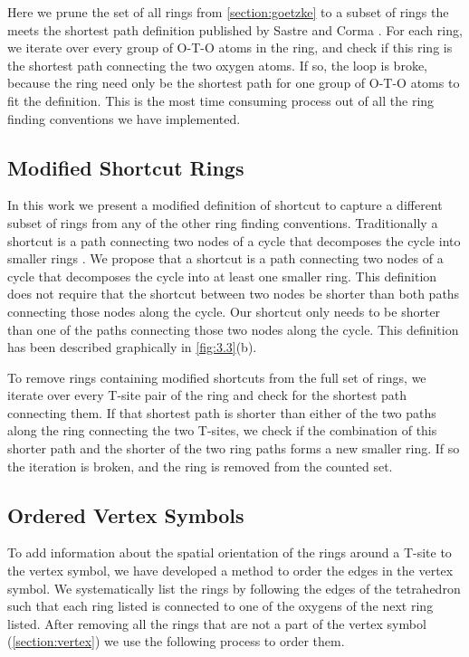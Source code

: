 \documentclass[preprint,numrefs,noinfo,sort&compress]{elsarticle}
\begin{document}
Here we prune the set of all rings from \cref{section:goetzke} to a subset of rings the meets the shortest path definition published by Sastre and Corma \cite{sastre-topological-2009}. For each ring, we iterate over every group of O-T-O atoms in the ring, and check if this ring is the shortest path connecting the two oxygen atoms. If so, the loop is broke, because the ring need only be the shortest path for one group of O-T-O atoms to fit the definition. This is the most time consuming process out of all the ring finding conventions we have implemented.

\subsection{Modified Shortcut Rings \label{section:modified}}
\label{sec:orgb03fdff}

In this work we present a modified definition of shortcut to capture a different subset of rings from any of the other ring finding conventions. Traditionally a shortcut is a path connecting two nodes of a cycle that decomposes the cycle into smaller rings \cite{guttman-ring-1990,goetzke-properties-1991}. We propose that a shortcut is a path connecting two nodes of a cycle that decomposes the cycle into at least one smaller ring. This definition does not require that the shortcut between two nodes be shorter than both paths connecting those nodes along the cycle. Our shortcut only needs to be shorter than one of the paths connecting those two nodes along the cycle. This definition has been described graphically in \cref{fig:3.3}(b).

To remove rings containing modified shortcuts from the full set of rings, we iterate over every T-site pair of the ring and check for the shortest path connecting them. If that shortest path is shorter than either of the two paths along the ring connecting the two T-sites, we check if the combination of this shorter path and the shorter of the two ring paths forms a new smaller ring. If so the iteration is broken, and the ring is removed from the counted set. 

\subsection{Ordered Vertex Symbols \label{section:ov}}
\label{sec:orgec814e5}

To add information about the spatial orientation of the rings around a T-site to the vertex symbol, we have developed a method to order the edges in the vertex symbol. We systematically list the rings by following the edges of the tetrahedron such that each ring listed is connected to one of the oxygens of the next ring listed. After removing all the rings that are not a part of the vertex symbol (\cref{section:vertex}) we use the following process to order them. 
\end{document}
